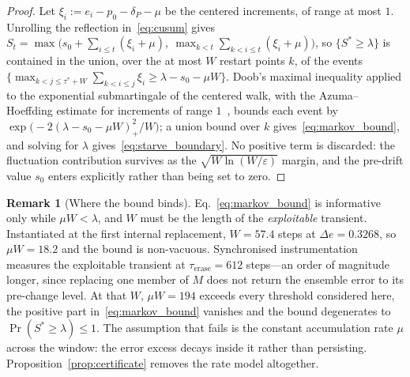 \documentclass[10pt,conference]{IEEEtran}
\theoremstyle{definition}
\newtheorem{remark}[theorem]{Remark}
\newcommand{\SixCanonDeltaE}{0.3268}         %
\newcommand{\SixTauFirst}{57.4}              %
\newcommand{\SixTauErase}{612}               %
\newcommand{\SixMuWfirst}{18.2}              %
\newcommand{\SixMuWerase}{194}               %
\begin{document}
\begin{proof}
  Let $\xi_i := e_i - p_0 - \delta_P - \mu$ be the centered increments, of range at most $1$. Unrolling the reflection in~\eqref{eq:cusum} gives $S_t = \max\bigl(s_0 + \sum_{i \le t}(\xi_i + \mu),\ \max_{k < t}\sum_{k < i \le t}(\xi_i + \mu)\bigr)$, so $\{S^* \ge \lambda\}$ is contained in the union, over the at most $W$ restart points $k$, of the events $\bigl\{\max_{k < j \le \tau^*+W}\sum_{k < i \le j}\xi_i \ge \lambda - s_0 - \mu W\bigr\}$. Doob's maximal inequality applied to the exponential submartingale of the centered walk, with the Azuma--Hoeffding estimate for increments of range $1$~\cite{hoeffding_1963,tartakovsky_2014}, bounds each event by $\exp\bigl(-2(\lambda - s_0 - \mu W)_{+}^{2}/W\bigr)$; a union bound over $k$ gives~\eqref{eq:markov_bound}, and solving for $\lambda$ gives~\eqref{eq:starve_boundary}. No positive term is discarded: the fluctuation contribution survives as the $\sqrt{W \ln(W/\varepsilon)}$ margin, and the pre-drift value $s_0$ enters explicitly rather than being set to zero.
\end{proof}

\begin{remark}[Where the bound binds]\label{rem:transient_length}
  Eq.~\eqref{eq:markov_bound} is informative only while $\mu W < \lambda$, and $W$ must be the length of the \emph{exploitable} transient. Instantiated at the first internal replacement, $W = \SixTauFirst$ steps at $\Delta e = \SixCanonDeltaE$, so $\mu W = \SixMuWfirst$ and the bound is non-vacuous. Synchronised instrumentation measures the exploitable transient at $\tau_{\mathrm{erase}} = \SixTauErase$ steps---an order of magnitude longer, since replacing one member of $M$ does not return the ensemble error to its pre-change level. At that $W$, $\mu W = \SixMuWerase$ exceeds every threshold considered here, the positive part in~\eqref{eq:markov_bound} vanishes and the bound degenerates to $\Pr(S^* \ge \lambda) \le 1$. The assumption that fails is the constant accumulation rate $\mu$ across the window: the error excess decays inside it rather than persisting. Proposition~\ref{prop:certificate} removes the rate model altogether.
\end{remark}
\end{document}

